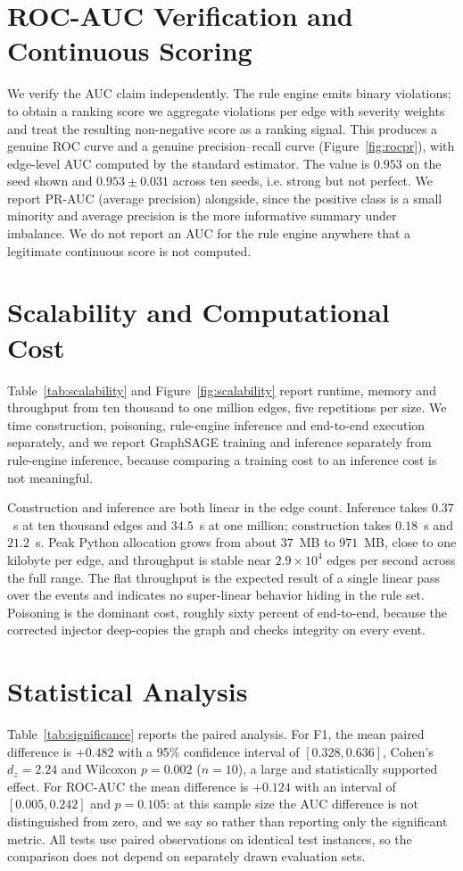 \documentclass[journal]{IEEEtran}
\begin{document}


\section{ROC-AUC Verification and Continuous Scoring}
\label{sec:rocauaudit}
We verify the AUC claim independently. The rule engine emits binary violations;
to obtain a ranking score we aggregate violations per edge with severity weights
and treat the resulting non-negative score as a ranking signal. This produces a
genuine ROC curve and a genuine precision--recall curve
(Figure~\ref{fig:rocpr}), with edge-level AUC computed by the standard estimator.
The value is $0.953$ on the seed shown and $0.953\pm0.031$ across ten seeds, i.e.
strong but not perfect. We report PR-AUC (average precision) alongside, since the
positive class is a small minority and average precision is the more informative
summary under imbalance. We do not report an AUC for the rule engine anywhere
that a legitimate continuous score is not computed.

\section{Scalability and Computational Cost}
\label{sec:scalability}
Table~\ref{tab:scalability} and Figure~\ref{fig:scalability} report runtime,
memory and throughput from ten thousand to one million edges, five repetitions
per size. We time construction, poisoning, rule-engine inference and end-to-end
execution separately, and we report GraphSAGE training and inference separately
from rule-engine inference, because comparing a training cost to an inference
cost is not meaningful.

Construction and inference are both linear in the edge count. Inference takes
$0.37$~s at ten thousand edges and $34.5$~s at one million; construction takes
$0.18$~s and $21.2$~s. Peak Python allocation grows from about $37$~MB to
$971$~MB, close to one kilobyte per edge, and throughput is stable near
$2.9\times10^{4}$ edges per second across the full range. The flat throughput is
the expected result of a single linear pass over the events and indicates no
super-linear behavior hiding in the rule set. Poisoning is the dominant cost,
roughly sixty percent of end-to-end, because the corrected injector deep-copies
the graph and checks integrity on every event.

\section{Statistical Analysis}
\label{sec:statistics}
Table~\ref{tab:significance} reports the paired analysis. For F1, the mean paired
difference is $+0.482$ with a 95\% confidence interval of $[0.328, 0.636]$,
Cohen's $d_z=2.24$ and Wilcoxon $p=0.002$ ($n=10$), a large and statistically
supported effect. For ROC-AUC the mean difference is $+0.124$ with an interval of
$[0.005, 0.242]$ and $p=0.105$: at this sample size the AUC difference is not
distinguished from zero, and we say so rather than reporting only the significant
metric. All tests use paired observations on identical test instances, so the
comparison does not depend on separately drawn evaluation sets.
\end{document}
